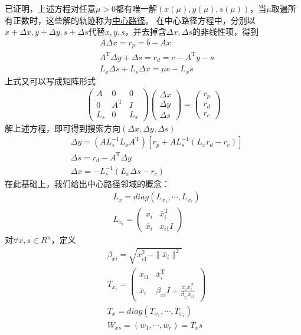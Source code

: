         已证明，上述方程对任意$\mu > 0$都有唯一解$(x(\mu),y(\mu),s(\mu))$，当$\mu$取遍所有正数时，这些解的轨迹称为\underline{中心路径}。
        在中心路径方程中，分别以$x+\Delta x,y+\Delta y,s+\Delta s$代替$x,y,s$，并去掉含$\Delta x,\Delta s$的非线性项，得到
        \begin{align*}
           & A\Delta x=r_p=b-Ax\\
           & A^\mathrm{T} \Delta y+\Delta s=r_d=c-A^\mathrm{T} y-s\\
           & L_x\Delta s+L_s\Delta x=\mu e-L_xs
        \end{align*}
        上式又可以写成矩阵形式
        \begin{align*}
           \begin{pmatrix} A & 0 & 0\\0 & A^\mathrm{T}  & I\\L_s & 0 & L_x\end{pmatrix}\begin{pmatrix} \Delta x \\ \Delta y \\ \Delta s \end{pmatrix}=\begin{pmatrix} r_p \\ r_d \\ r_c \end{pmatrix}
        \end{align*}
        解上述方程，即可得到搜索方向$(\Delta x , \Delta y , \Delta s)$
        \begin{align*}
           & \Delta y = (AL_s^{-1}L_xA^\mathrm{T} )[r_p+AL_s^{-1}(L_xr_d-r_c)]\\
           & \Delta s = r_d-A^\mathrm{T} \Delta y\\
           & \Delta x = -L_s^{-1}(L_x\Delta s-r_c)
        \end{align*}
        在此基础上，我们给出中心路径邻域的概念：
        \begin{align*}
           & L_x = diag(L_{x_1},\cdots,L_{x_r})\\
           & L_{x_i} = \begin{pmatrix} x_i & {\bar{x}}_i^\mathrm{T}  \\ {\bar{x}}_i & x_{i1}I \end{pmatrix}
        \end{align*}
        对$\forall x,s\in R^n$，定义
        \begin{align*}
           & {\beta}_{xi} = \sqrt{x_{i1}^2-\|{\bar{x}}_i\|^2}\\
           & T_{x_i} = \begin{pmatrix} x_{i1} & {\bar{x}}_i^\mathrm{T}  \\ {\bar{x}}_i & {\beta}_{xi}I+\frac{{\bar{x}}_i{\bar{x}}_i^\mathrm{T} }{{\beta}_{x_i}x_{i1}} \end{pmatrix}\\
           & T_x=diag(T_{x_1},\cdots,T_{x_r})\\
           & W_{xs} = (w_1,\cdots,w_r)=T_{x}s
        \end{align*}
